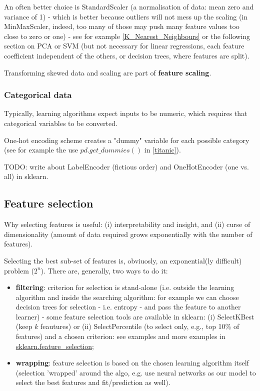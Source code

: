\documentclass[11pt]{article}
\begin{document}
An often better choice is StandardScaler (a normalisation of data: mean zero and variance of 1) - which is better because outliers will not mess up the scaling (in MinMaxScaler, indeed, too many of those may push many feature values too close to zero or one) - see for example \ref{K_Nearest_Neighbours} or the following section on PCA or SVM (but not necessary for linear regressions, each feature coefficient independent of the others, or decision trees, where features are split). 

Transforming skewed data and scaling are part of \textbf{feature scaling}.

\subsubsection*{Categorical data}
Typically, learning algorithms expect inputs to be numeric, which requires that categorical variables to be converted. 

One-hot encoding scheme creates a "dummy" variable for each possible category (see for example the use $pd.get\_dummies()$ in \ref{titanic}). 

TODO: write about LabelEncoder (fictious order)  and OneHotEncoder (one vs. all) in sklearn. 


\subsection{Feature selection}
Why selecting features is useful: (i) interpretability and insight, and (ii) curse of dimensionality (amount of data required grows exponentially with the number of features).

Selecting the best sub-set of features is, obviuosly, an exponential(ly difficult) problem ($2^n$). There are, generally, two ways to do it:
\begin{itemize}
	\item \textbf{filtering}: criterion for selection is stand-alone (i.e. outside the learning algorithm and inside the searching algorithm: for example we can choose decision trees for selection - i.e. entropy - and pass the feature to another learner) - some feature selection tools are available in sklearn: (i) SelectKBest (keep $k$ feautures) or (ii) SelectPercentile (to select only, e.g., top 10\% of features) and a chosen criterion: see examples and more examples in \href{http://scikit-learn.org/stable/modules/feature_selection.html}{sklearn.feature\_selection};
	\item \textbf{wrapping}: feature selection is based on the chosen learning algorithm itself (selection 'wrapped' around the algo, e.g. use neural networks as our model to select the best features and fit/prediction as well). 
\end{itemize}
\end{document}
